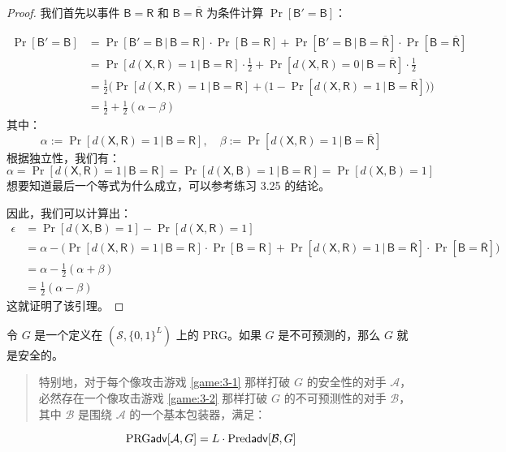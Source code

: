 \begin{proof}
我们首先以事件 $\mathsf{B}=\mathsf{R}$ 和 $\mathsf{B}=\mathsf{\overline R}$ 为条件计算 $\Pr[\mathsf{B}'=\mathsf{B}]$：

$$
\begin{aligned}
\Pr[\mathsf{B}'=\mathsf{B}]
&=\Pr[\mathsf{B}'=\mathsf{B}\,|\,\mathsf{B}=\mathsf{R}]\cdot\Pr[\mathsf{B}=\mathsf{R}]+\Pr[\mathsf{B}'=\mathsf{B}\,|\,\mathsf{B}=\mathsf{\overline R}]\cdot\Pr[\mathsf{B}=\mathsf{\overline R}]\\
&=\Pr[d(\mathsf{X},\mathsf{R})=1\,|\,\mathsf{B}=\mathsf{R}]\cdot\frac{1}{2}+\Pr[d(\mathsf{X},\mathsf{R})=0\,|\,\mathsf{B}=\mathsf{\overline R}]\cdot\frac{1}{2}\\
&=\frac{1}{2}
\Big(\Pr[d(\mathsf{X},\mathsf{R})=1\,|\,\mathsf{B}=\mathsf{R}]+
\big(
1-\Pr[d(\mathsf{X},\mathsf{R})=1\,|\,\mathsf{B}=\mathsf{\overline R}]
\big)
\Big)\\
&=\frac{1}{2}+\frac{1}{2}(\alpha-\beta)
\end{aligned}
$$
其中：
$$
\alpha:=\Pr[d(\mathsf{X},\mathsf{R})=1\,|\,\mathsf{B}=\mathsf{R}],\quad
\beta:=\Pr[d(\mathsf{X},\mathsf{R})=1\,|\,\mathsf{B}=\mathsf{\overline R}]
$$
根据独立性，我们有：
$$
\alpha=\Pr[d(\mathsf{X},\mathsf{R})=1\,|\,\mathsf{B}=\mathsf{R}]=\Pr[d(\mathsf{X},\mathsf{B})=1\,|\,\mathsf{B}=\mathsf{R}]=\Pr[d(\mathsf{X},\mathsf{B})=1]
$$
想要知道最后一个等式为什么成立，可以参考练习 3.25 的结论。

因此，我们可以计算出：
$$
\begin{aligned}
\epsilon
&=\Pr[d(\mathsf{X},\mathsf{B})=1]-\Pr[d(\mathsf{X},\mathsf{R})=1]\\
&=\alpha-
\Big(\Pr[d(\mathsf{X},\mathsf{R})=1\,|\,\mathsf{B}=\mathsf{R}]\cdot\Pr[\mathsf{B}=\mathsf{R}]+\Pr[d(\mathsf{X},\mathsf{R})=1\,|\,\mathsf{B}=\mathsf{\overline R}]\cdot\Pr[\mathsf{B}=\mathsf{\overline R}]
\Big)\\
&=\alpha-\frac{1}{2}(\alpha+\beta)\\
&=\frac{1}{2}(\alpha-\beta)
\end{aligned}
$$
这就证明了该引理。
\end{proof}

\begin{theorem}
令 $G$ 是一个定义在 $(\mathcal{S},\{0,1\}^L)$ 上的 PRG。如果 $G$ 是不可预测的，那么 $G$ 就是安全的。
\begin{quote}
特别地，对于每个像攻击游戏 \ref{game:3-1} 那样打破 $G$ 的安全性的对手 $\mathcal{A}$，必然存在一个像攻击游戏 \ref{game:3-2} 那样打破 $G$ 的不可预测性的对手 $\mathcal{B}$，其中 $\mathcal{B}$ 是围绕 $\mathcal{A}$ 的一个基本包装器，满足：
\end{quote}
$$
{\rm PRG\mathsf{adv}}[\mathcal{A},G]=L\cdot{\rm Pred\mathsf{adv}}[\mathcal{B},G]
$$
\end{theorem}

